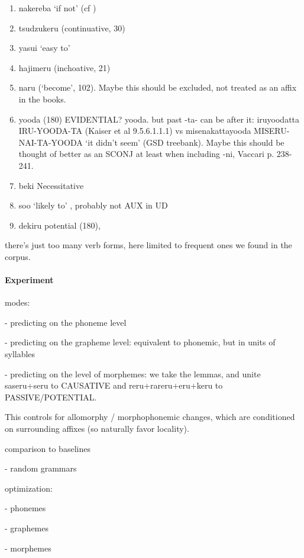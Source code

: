 \documentclass[11pt,letterpaper]{article}
\begin{document}
\begin{enumerate}
\item nakereba `if not' (cf \cite[9.3.1.4]{kaiser2013japanese})
\item tsudzukeru (continuative, 30)
\item yasui `easy to'
\item hajimeru (inchoative, 21)
\item naru (`become', 102). Maybe this should be excluded, not treated as an affix in the books.
\item yooda (180) EVIDENTIAL? yooda. but past -ta- can be after it: iruyoodatta IRU-YOODA-TA (Kaiser et al 9.5.6.1.1.1) vs misenakattayooda MISERU-NAI-TA-YOODA `it didn't seem' (GSD treebank). Maybe this should be thought of better as an SCONJ at least when including -ni, Vaccari p. 238-241.
\item beki Necessitative \cite[248]{kaiser2013japanese}
\item soo `likely to' \cite[258]{kaiser2013japanese}, probably not AUX in UD
\item dekiru potential (180), 
\end{enumerate}


there's just too many verb forms, here limited to frequent ones we found in the corpus.


\paragraph{Experiment}

modes:

- predicting on the phoneme level

- predicting on the grapheme level: equivalent to phonemic, but in units of syllables

- predicting on the level of morphemes: we take the lemmas, and unite saseru+seru to CAUSATIVE and reru+rareru+eru+keru to PASSIVE/POTENTIAL.

This controls for allomorphy / morphophonemic changes, which are conditioned on surrounding affixes (so naturally favor locality).


comparison to baselines

- random grammars

optimization:

- phonemes

- graphemes

- morphemes



\end{document}
